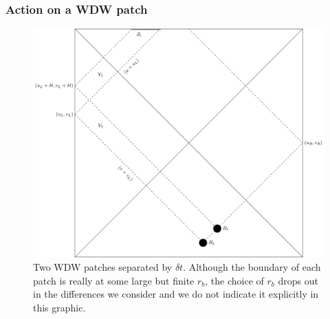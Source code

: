\documentclass[10pt]{beamer}
\begin{document}
\begin{frame}
\frametitle{Action on a WDW patch}

\begin{figure}
    \begin{center}
    
        \includegraphics[scale=0.5]{WDW.pdf}    
    
    \end{center}
    \caption{Two WDW patches separated by $\delta t$.  Although the boundary of each patch is really at some large but finite $r_b$, the choice of $r_b$ drops out in the differences we consider and we do not indicate it explicitly in this graphic.}
    \label{fig:WDW}
\end{figure}

\end{frame}
\end{document}
